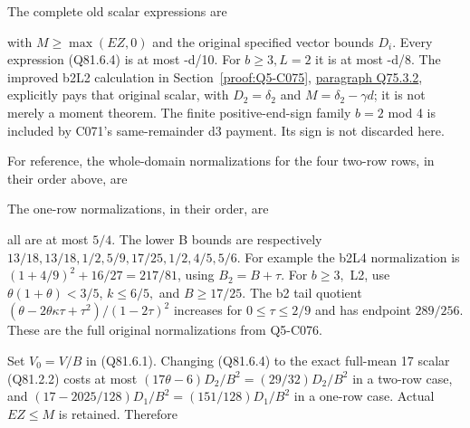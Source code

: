 The complete old scalar expressions are


with \(M\ge\max(EZ,\allowbreak  0)\) and the original specified vector bounds \(D_i.\)
Every expression (Q81.6.4) is at most -d/10. For \(b\ge 3,\allowbreak  L=2\) it is at most
-d/8. The improved b2L2 calculation in Section~\ref{proof:Q5-C075}, \hyperref[part:Q75.3.2]{paragraph Q75.3.2}, explicitly
pays that original scalar, with \(D_2=\delta_2\) and
\(M=\delta_2-\gamma d\); it is not merely a moment theorem.
The finite positive-end-sign family \(b=2\) mod 4 is included by C071's
same-remainder d3 payment. Its sign is not discarded here.

For reference, the whole-domain normalizations for the four two-row
rows, in their order above, are


The one-row normalizations, in their order, are


all are at most \(5/4.\) The lower B bounds are respectively
\(13/18,\allowbreak  13/18,\allowbreak  1/2,\allowbreak  5/9,\allowbreak  17/25,\allowbreak  1/2,\allowbreak  4/5,\allowbreak  5/6.\)
For example the b2L4 normalization is
\((1+4/9)^2+16/27=217/81\), using \(B_2=B+\tau\).
For \(b\ge 3,\allowbreak \) L2, use \(\theta(1+\theta)<3/5\), \(k\le 6/5,\allowbreak \)
and \(B\ge 17/25.\) The b2 tail quotient
\((\theta-2\theta\kappa\tau+\tau^2)/(1-2\tau)^2\)
increases for \(0\le \tau\le 2/9\) and has endpoint \(289/256.\)
These are the full original normalizations from Q5-C076.

Set \(V_0=V/B\) in (Q81.6.1). Changing (Q81.6.4) to the exact full-mean
17 scalar (Q81.2.2) costs at most \((17\theta-6)D_2/B^2=(29/32)D_2/B^2\)
in a two-row case, and \((17-2025/128)D_1/B^2=(151/128)D_1/B^2\)
in a one-row case. Actual \(EZ\le M\) is retained. Therefore


